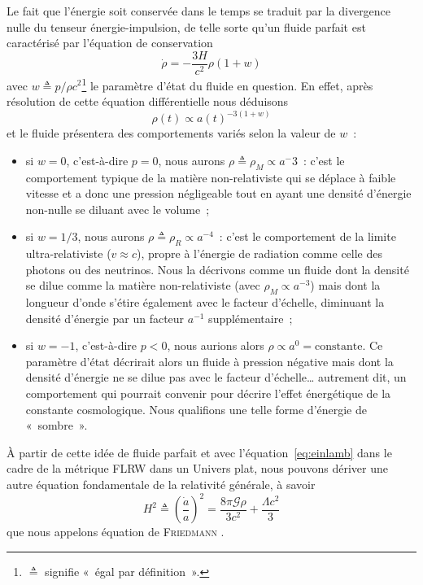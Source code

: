 \documentclass[../main/main.tex]{subfiles}
\begin{document}
Le fait que l'énergie soit conservée dans le temps se traduit par la divergence
nulle du tenseur énergie-impulsion, de telle sorte qu'un fluide parfait est
caractérisé par l'équation de conservation
\begin{equation}\label{eq:cons}
    \dot{\rho} = -\frac{3H}{c^2}\rho(1+w)
\end{equation}
avec $w \triangleq p/\rho c^2$\footnote{$\triangleq$ signifie «~égal par
définition~».} le paramètre d'état du fluide en question. En effet, après
résolution de cette équation différentielle nous déduisons
\begin{equation}\label{eq:rho}
    \rho(t) \propto a(t)^{-3(1+w)}
\end{equation}
et le fluide présentera des comportements variés selon la valeur de $w$~:
\begin{itemize}
    \item si $w=0$, c'est-à-dire $p=0$, nous aurons $\rho \triangleq \rho_M
        \propto a^-3$~: c'est le comportement typique de la matière
        non-relativiste
        qui se déplace à faible vitesse et a donc une pression négligeable tout
        en ayant une densité d'énergie non-nulle se diluant avec le volume~;

    \item si $w=1/3$, nous aurons $\rho \triangleq \rho_R \propto a^{-4}$~:
        c'est le comportement de la limite ultra-relativiste ($v \approx c$),
        propre à l'énergie de radiation comme celle des photons ou des
        neutrinos. Nous la décrivons comme un fluide dont la densité se dilue
        comme la matière non-relativiste (avec $\rho_M \propto a^{-3}$) mais
        dont la longueur d'onde s'étire également avec le facteur d'échelle,
        diminuant la densité d'énergie par un facteur $a^{-1}$ supplémentaire~;

    \item si $w=-1$, c'est-à-dire $p < 0$, nous aurions alors $\rho \propto a^0
        = \text{constante}$. Ce paramètre d'état décrirait alors un fluide à
        pression négative mais dont la densité d'énergie ne se dilue pas avec le
        facteur d'échelle… autrement dit, un comportement qui pourrait convenir
        pour décrire l'effet énergétique de la constante cosmologique. Nous
        qualifions une telle forme d'énergie de «~sombre~».
\end{itemize}

À partir de cette idée de fluide parfait et avec l'équation~\ref{eq:einlamb}
dans le cadre de la métrique FLRW dans un Univers plat, nous pouvons dériver une
autre équation fondamentale de la relativité générale, à savoir
\begin{equation}\label{eq:fried}
    H^2 \triangleq \left( \frac{\dot{a}}{a} \right)^2 =
    \frac{8\pi\mathcal{G}\rho}{3c^2} + \frac{\Lambda c^2}{3}
\end{equation}
que nous appelons équation de \textsc{Friedmann} \citep{friedmann1922}.
\end{document}
